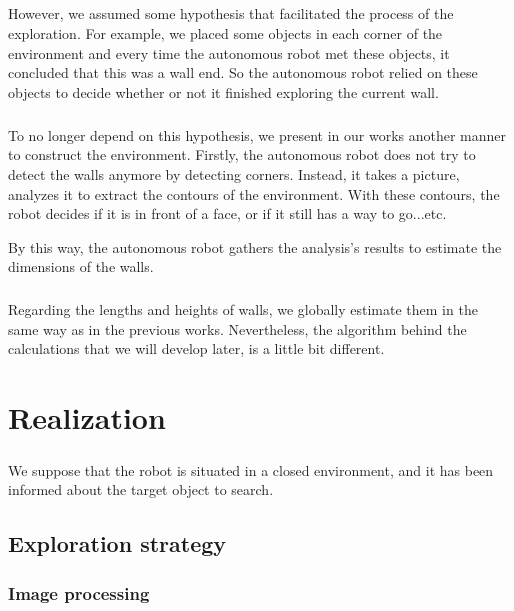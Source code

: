 \documentclass[12pt]{report}
\begin{document}
	\paragraph{}
	However, we assumed some hypothesis that facilitated the process of the exploration. For example, we placed some objects in each corner of the environment and every time the autonomous robot met these objects, it concluded that this was a wall end. So the autonomous robot relied on these objects to decide whether or not it finished exploring the current wall. 
	
	\paragraph{}
	To no longer depend on this hypothesis, we present in our works another manner to construct the environment. Firstly, the autonomous robot does not try to detect the walls anymore by detecting corners. Instead, it takes a picture, analyzes it to extract the contours of the environment. With these contours, the robot decides if it is in front of a face, or if it still has a way to go...etc.
	
	By this way, the autonomous robot gathers the analysis's results to estimate the dimensions of the walls.
	
	\paragraph{}
	Regarding the lengths and heights of walls, we globally estimate them in the same way as in the previous works. Nevertheless, the algorithm behind the calculations that we will develop later, is a little bit different. 

    \chapter{Realization}
    \paragraph{}
    We suppose that the robot is situated in a closed environment, and it has been informed about the target object to search. 
	\section{Exploration strategy}
	 \subsection{Image processing}
\end{document}
